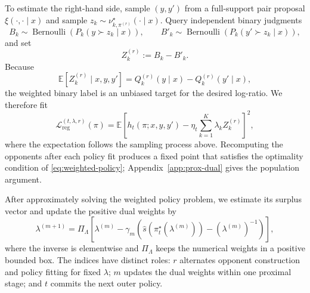 \documentclass{article}
\theoremstyle{remark}
\theoremstyle{plain}
\newcommand{\E}{\mathbb{E}}
\begin{document}
To estimate the right-hand side, sample $(y,y')$ from a full-support pair proposal $\xi(\cdot,\cdot\mid x)$ and sample $z_k\sim\nu^\star_{k,\pi^{(r)}}(\cdot\mid x)$. Query independent binary judgments
\[
B_k\sim\operatorname{Bernoulli}(P_k(y\succ z_k\mid x)),
\qquad
B'_k\sim\operatorname{Bernoulli}(P_k(y'\succ z_k\mid x)),
\]
and set
\begin{equation}
Z_k^{(r)}:=B_k-B'_k.
\label{eq:binary-target}
\end{equation}
Because
\begin{equation}
\E[Z_k^{(r)}\mid x,y,y']
=
Q_k^{(r)}(y\mid x)-Q_k^{(r)}(y'\mid x),
\label{eq:binary-target-mean}
\end{equation}
the weighted binary label is an unbiased target for the desired log-ratio. We therefore fit
\begin{equation}
\mathcal L_{\mathrm{reg}}^{(t,\lambda,r)}(\pi)
=
\E\!\left[
 h_t(\pi;x,y,y')
-
\eta_t\sum_{k=1}^K\lambda_k Z_k^{(r)}
\right]^2,
\label{eq:regression-loss}
\end{equation}
where the expectation follows the sampling process above. Recomputing the opponents after each policy fit produces a fixed point that satisfies the optimality condition of \eqref{eq:weighted-policy}; Appendix~\ref{app:prox-dual} gives the population argument.

After approximately solving the weighted policy problem, we estimate its surplus vector and update the positive dual weights by
\begin{equation}
\lambda^{(m+1)}
=
\Pi_{\Lambda}\!\left[
\lambda^{(m)}
-
\gamma_m\left(
\widehat s\!\left(\pi_t^\star(\lambda^{(m)})\right)
-
(\lambda^{(m)})^{-1}
\right)
\right],
\label{eq:dual-update}
\end{equation}
where the inverse is elementwise and $\Pi_\Lambda$ keeps the numerical weights in a positive bounded box. The indices have distinct roles: $r$ alternates opponent construction and policy fitting for fixed $\lambda$; $m$ updates the dual weights within one proximal stage; and $t$ commits the next outer policy.
\end{document}

